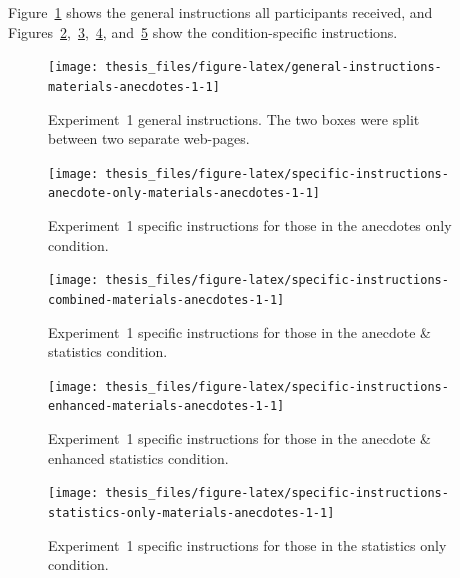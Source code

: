 \documentclass[a4paper, nobind, dvipsnames]{templates/ociamthesis}
\theoremstyle{definition}
\theoremstyle{definition}
\theoremstyle{definition}
\theoremstyle{definition}
\theoremstyle{remark}
\begin{document}
Figure~\ref{fig:general-instructions-materials-anecdotes-1} shows the general
instructions all participants received, and
Figures~\ref{fig:specific-instructions-anecdote-only-materials-anecdotes-1},~\ref{fig:specific-instructions-combined-materials-anecdotes-1},~\ref{fig:specific-instructions-enhanced-materials-anecdotes-1},
and~\ref{fig:specific-instructions-statistics-only-materials-anecdotes-1} show
the condition-specific instructions.



\begin{figure}
\texttt{[image: thesis\_files/figure-latex/general-instructions-materials-anecdotes-1-1]} \caption{Experiment~1 general instructions. The two boxes were split between two separate web-pages.}\label{fig:general-instructions-materials-anecdotes-1}
\end{figure}



\begin{figure}
\texttt{[image: thesis\_files/figure-latex/specific-instructions-anecdote-only-materials-anecdotes-1-1]} \caption{Experiment~1 specific instructions for those in the anecdotes only condition.}\label{fig:specific-instructions-anecdote-only-materials-anecdotes-1}
\end{figure}



\begin{figure}
\texttt{[image: thesis\_files/figure-latex/specific-instructions-combined-materials-anecdotes-1-1]} \caption{Experiment~1 specific instructions for those in the anecdote \& statistics condition.}\label{fig:specific-instructions-combined-materials-anecdotes-1}
\end{figure}



\begin{figure}
\texttt{[image: thesis\_files/figure-latex/specific-instructions-enhanced-materials-anecdotes-1-1]} \caption{Experiment~1 specific instructions for those in the anecdote \& enhanced statistics condition.}\label{fig:specific-instructions-enhanced-materials-anecdotes-1}
\end{figure}



\begin{figure}
\texttt{[image: thesis\_files/figure-latex/specific-instructions-statistics-only-materials-anecdotes-1-1]} \caption{Experiment~1 specific instructions for those in the statistics only condition.}\label{fig:specific-instructions-statistics-only-materials-anecdotes-1}
\end{figure}
\end{document}
